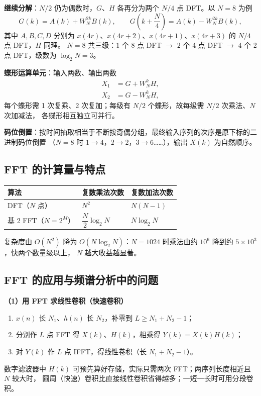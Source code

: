 \textbf{继续分解}：$N/2$ 仍为偶数时，$G$、$H$ 各再分为两个 $N/4$ 点 DFT。以 $N=8$ 为例
\begin{equation}
G(k)=A(k)+W_N^{2k}B(k),\qquad
G\!\left(k+\frac{N}{4}\right)=A(k)-W_N^{2k}B(k),
\end{equation}
其中 $A,B,C,D$ 分别为 $x(4r)$、$x(4r+2)$、$x(4r+1)$、$x(4r+3)$ 的 $N/4$ 点 DFT，$H$ 同理。
$N=8$ 共三级：$1$ 个 8 点 DFT $\to$ $2$ 个 4 点 DFT $\to$ $4$ 个 2 点 DFT，级数为 $\log_2N=3$。

\textbf{蝶形运算单元}：输入两数、输出两数
\begin{equation}
\begin{aligned}
X_1&=G+W_N^{k}H,\\
X_2&=G-W_N^{k}H,
\end{aligned}
\end{equation}
每个蝶形需 1 次复乘、2 次复加；每级有 $N/2$ 个蝶形，故每级需 $N/2$ 次乘法、$N$ 次加减法，
各蝶形相互独立可并行。

\textbf{码位倒置}：按时间抽取相当于不断按奇偶分组，最终输入序列的次序是原下标的二进制码位倒置
（$N=8$ 时 $1\to4$，$2\to2$，$3\to6$……），输出 $X(k)$ 为自然顺序。

\subsection{FFT 的计算量与特点}

\begin{center}
\begin{tabular}{lll}
\toprule
算法 & 复数乘法次数 & 复数加法次数 \\
\midrule
DFT（$N$ 点） & $N^2$ & $N(N-1)$ \\
基 2 FFT（$N=2^M$） & $\dfrac{N}{2}\log_2N$ & $N\log_2N$ \\
\bottomrule
\end{tabular}
\end{center}
复杂度由 $O(N^2)$ 降为 $O(N\log_2N)$：$N=1024$ 时乘法由约 $10^6$ 降到约 $5\times10^3$，快两个数量级以上，
$N$ 越大收益越显著。

\subsection{FFT 的应用与频谱分析中的问题}

\textbf{（1）用 FFT 求线性卷积（快速卷积）}
\begin{enumerate}
\item $x(n)$ 长 $N_1$、$h(n)$ 长 $N_2$，补零到 $L\ge N_1+N_2-1$；
\item 分别作 $L$ 点 FFT 得 $X(k)$、$H(k)$，相乘得 $Y(k)=X(k)H(k)$；
\item 对 $Y(k)$ 作 $L$ 点 IFFT，得线性卷积（长 $N_1+N_2-1$）。
\end{enumerate}
数字滤波器中 $H(k)$ 可预先算好存储，实际只需两次 FFT；两序列长度相近且 $N$ 较大时，
圆周（快速）卷积比直接线性卷积省得越多；一短一长时可用分段卷积。

